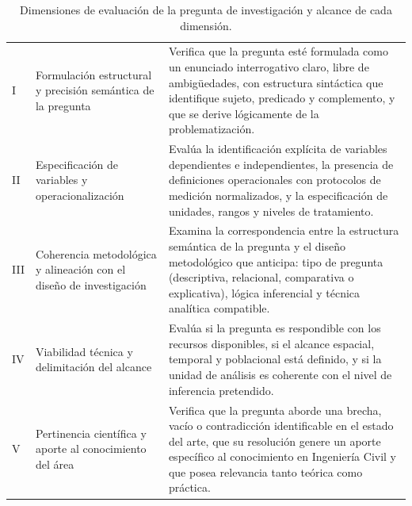 \begin{table}[htbp]
\centering
\scriptsize
\caption{Dimensiones de evaluación de la pregunta de investigación y alcance de cada dimensión.}
\label{tab:dim-pregunta}
\begin{tabularx}{\textwidth}{|C{0.8cm}|L{4.5cm}|X|}
\hline
{}
 &  &  \\ \hline
I & Formulación estructural y precisión semántica de la pregunta & Verifica que la pregunta esté formulada como un enunciado interrogativo claro, libre de ambigüedades, con estructura sintáctica que identifique sujeto, predicado y complemento, y que se derive lógicamente de la problematización. \\ \hline
{}
II & Especificación de variables y operacionalización & Evalúa la identificación explícita de variables dependientes e independientes, la presencia de definiciones operacionales con protocolos de medición normalizados, y la especificación de unidades, rangos y niveles de tratamiento. \\ \hline
III & Coherencia metodológica y alineación con el diseño de investigación & Examina la correspondencia entre la estructura semántica de la pregunta y el diseño metodológico que anticipa: tipo de pregunta (descriptiva, relacional, comparativa o explicativa), lógica inferencial y técnica analítica compatible. \\ \hline
{}
IV & Viabilidad técnica y delimitación del alcance & Evalúa si la pregunta es respondible con los recursos disponibles, si el alcance espacial, temporal y poblacional está definido, y si la unidad de análisis es coherente con el nivel de inferencia pretendido. \\ \hline
V & Pertinencia científica y aporte al conocimiento del área & Verifica que la pregunta aborde una brecha, vacío o contradicción identificable en el estado del arte, que su resolución genere un aporte específico al conocimiento en Ingeniería Civil y que posea relevancia tanto teórica como práctica. \\ \hline
\end{tabularx}
\end{table}

